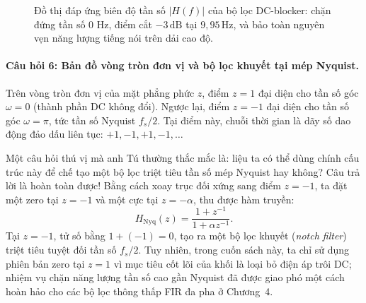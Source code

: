 \begin{figure}[H]
\centering
{}
\caption{Đồ thị đáp ứng biên độ tần số $|H(f)|$ của bộ lọc DC-blocker: chặn đứng tần số 0 Hz, điểm cắt $-3\,\text{dB}$ tại $9{,}95\,\text{Hz}$, và bảo toàn nguyên vẹn năng lượng tiếng nói trên dải cao độ.}
\label{fig:ch03_h_mag}
\end{figure}

\paragraph{Câu hỏi 6: Bản đồ vòng tròn đơn vị và bộ lọc khuyết tại mép Nyquist.}
Trên vòng tròn đơn vị của mặt phẳng phức $z$, điểm $z = 1$ đại diện cho tần số góc $\omega = 0$ (thành phần DC không đổi). Ngược lại, điểm $z = -1$ đại diện cho tần số góc $\omega = \pi$, tức tần số Nyquist $f_s / 2$. Tại điểm này, chuỗi thời gian là dãy số dao động đảo dấu liên tục: $+1, -1, +1, -1, \ldots$

Một câu hỏi thú vị mà anh Tú thường thắc mắc là: liệu ta có thể dùng chính cấu trúc này để chế tạo một bộ lọc triệt tiêu tần số mép Nyquist hay không? Câu trả lời là hoàn toàn được! Bằng cách xoay trục đối xứng sang điểm $z = -1$, ta đặt một zero tại $z = -1$ và một cực tại $z = -\alpha$, thu được hàm truyền:
\begin{equation}
H_{\mathrm{Nyq}}(z) = \frac{1 + z^{-1}}{1 + \alpha z^{-1}}.
\end{equation}
Tại $z = -1$, tử số bằng $1 + (-1) = 0$, tạo ra một bộ lọc khuyết (\emph{notch filter}) triệt tiêu tuyệt đối tần số $f_s / 2$. Tuy nhiên, trong cuốn sách này, ta chỉ sử dụng phiên bản zero tại $z = 1$ vì mục tiêu cốt lõi của khối là loại bỏ điện áp trôi DC; nhiệm vụ chặn năng lượng tần số cao gần Nyquist đã được giao phó một cách hoàn hảo cho các bộ lọc thông thấp FIR đa pha ở Chương~4.

